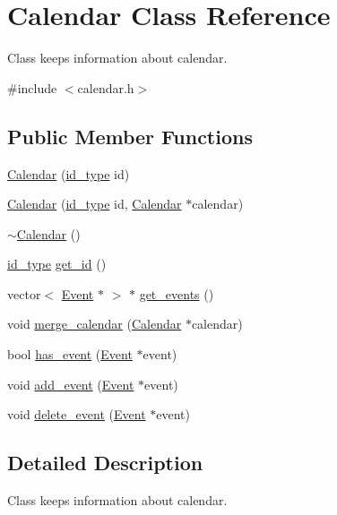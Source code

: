 \hypertarget{classCalendar}{
\section{Calendar Class Reference}
\label{dd/dac/classCalendar}
}


Class keeps information about calendar.  




{\ttfamily \#include $<$calendar.h$>$}

\subsection*{Public Member Functions}
\begin{DoxyCompactItemize}
\item 
\hyperlink{classCalendar_ae8e2987543087a4c91179e875388504e}{Calendar} (\hyperlink{types_8h_a0b60c08a3ab1435cccc5643d32d8ccee}{id\_\-type} id)
\item 
\hyperlink{classCalendar_a696db2224db4cc0c868dda320016dcad}{Calendar} (\hyperlink{types_8h_a0b60c08a3ab1435cccc5643d32d8ccee}{id\_\-type} id, \hyperlink{classCalendar}{Calendar} $\ast$calendar)
\item 
\hyperlink{classCalendar_a23aa939f694874a8f98ec54326d80741}{$\sim$Calendar} ()
\item 
\hyperlink{types_8h_a0b60c08a3ab1435cccc5643d32d8ccee}{id\_\-type} \hyperlink{classCalendar_ab9f9a418d5122e8f5915fd817b8422b1}{get\_\-id} ()
\item 
vector$<$ \hyperlink{classEvent}{Event} $\ast$ $>$ $\ast$ \hyperlink{classCalendar_aa1e9611c947c9b37975437b188066bf9}{get\_\-events} ()
\item 
void \hyperlink{classCalendar_a9ed5161b06c2a2acc8e5febbeeeb39b0}{merge\_\-calendar} (\hyperlink{classCalendar}{Calendar} $\ast$calendar)
\item 
bool \hyperlink{classCalendar_a46578e7e3f65bd5d523a108ad00965dd}{has\_\-event} (\hyperlink{classEvent}{Event} $\ast$event)
\item 
void \hyperlink{classCalendar_ad099edd0e82ca0a2ffb18702d029fffa}{add\_\-event} (\hyperlink{classEvent}{Event} $\ast$event)
\item 
void \hyperlink{classCalendar_a305abce38aacb905a0277f573f6b486c}{delete\_\-event} (\hyperlink{classEvent}{Event} $\ast$event)
\end{DoxyCompactItemize}


\subsection{Detailed Description}
Class keeps information about calendar. 

